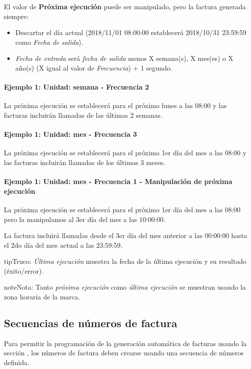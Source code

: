 \documentclass[letterpaper,10pt,spanish]{sphinxmanual}
\begin{document}
El valor de \textbf{Próxima ejecución} puede ser manipulado, pero la factura generada siempre:
\begin{itemize}
\item {} 
Descartar el día actual (2018/11/01 08:00:00 establecerá 2018/10/31 23:59:59 como \emph{Fecha de salida}).

\item {} 
\emph{Fecha de entrada} será \emph{fecha de salida} menos X semana(s), X mes(es) o X año(s) (X igual al valor de \emph{Frecuencia}) + 1 segundo.

\end{itemize}
\paragraph{Ejemplo 1: Unidad: semana - Frecuencia 2}

La próxima ejecución se establecerá para el próximo lunes a las 08:00 y las facturas incluirán llamadas de las últimas 2 semanas.
\paragraph{Ejemplo 1: Unidad: mes - Frecuencia 3}

La próxima ejecución se establecerá para el próximo 1er día del mes a las 08:00 y las facturas incluirán llamadas de los últimos 3 meses.
\paragraph{Ejemplo 1: Unidad: mes - Frecuencia 1 - Manipulación de próxima ejecución}

La próxima ejecución se establecerá para el próximo 1er día del mes a las 08:00 pero la manipulamos al 3er día del mes a las 10:00:00.

La factura incluirá llamadas desde el 3er día del mes anterior a las 00:00:00 hasta el 2do día del mes actual a las 23:59:59.

\begin{notice}{tip}{Truco:}
\emph{Última ejecución} muestra la fecha de la última ejecución y su resultado (éxito/error).
\end{notice}

\begin{notice}{note}{Nota:}
Tanto \emph{próxima ejecución} como \emph{última ejecución} se muestran usando la zona horaria de la marca.
\end{notice}


\subsection{Secuencias de números de factura}
\label{administration_portal/brand/invoicing/invoice_number_sequences:invoice-number-sequences}\label{administration_portal/brand/invoicing/invoice_number_sequences::doc}
Para permitir la programación de la generación automática de facturas usando la sección {\hyperref[administration_portal/brand/invoicing/invoice_schedulers:invoice\string-schedulers]{}}, los números de factura deben crearse usando una secuencia de números definida.
\end{document}
